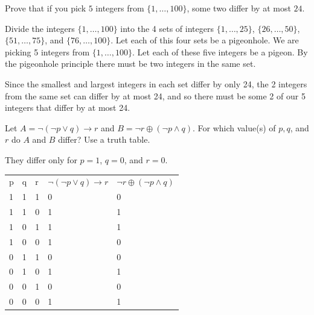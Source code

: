 \documentclass[solution, letterpaper]{cs20exam}
\begin{document}

\problem{}{} Prove that if you pick $5$ integers from $\{1, \ldots, 100\}$, some two differ by at most $24$.

\begin{solution}
Divide the integers $\{1, \ldots, 100\}$ into the 4 sets of integers $\{1, \ldots, 25\}$, $\{26, \ldots, 50\}$, $\{51, \ldots, 75\}$, and $\{76, \ldots, 100\}$. Let each of this four sets be a pigeonhole. We are picking 5 integers from $\{1, \ldots, 100\}$. Let each of these five integers be a pigeon. By the pigeonhole principle there must be two integers in the same set.  

Since the smallest and largest integers in each set differ by only 24, the 2 integers from the same set can differ by at most 24, and so there must be some 2 of our 5 integers that differ by at most 24.
\end{solution}

\problem{}{} Let $A = \neg (\neg p \lor q) \to r$ and $B = \neg r \oplus (\neg p \land q)$. For which value(s) of $p, q$, and $r$ do $A$ and $B$ differ? Use a truth table.

\begin{solution}
They differ only for $p = 1$, $q = 0$, and $r = 0$.
\begin{table}[h]
\centering
\begin{tabular}{lllll}
p & q & r & $\neg (\neg p \lor q) \to r$ & $\neg r \oplus (\neg p \land q)$ \\
1 & 1 & 1 & 0                               & 0                              \\
1 & 1 & 0 & 1                               & 1                              \\
1 & 0 & 1 & 1                               & 1                              \\
1 & 0 & 0 & 1                               & 0                              \\
0 & 1 & 1 & 0                               & 0                              \\
0 & 1 & 0 & 1                               & 1                              \\
0 & 0 & 1 & 0                               & 0                              \\
0 & 0 & 0 & 1                               & 1                             
\end{tabular}
\end{table}
\end{solution}
\end{document}

